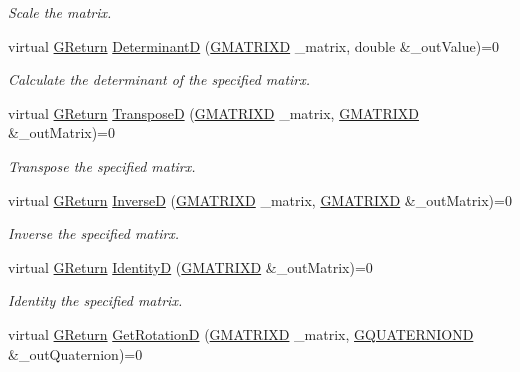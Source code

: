 \begin{DoxyCompactItemize}
\begin{DoxyCompactList}\small\item\em Scale the matrix. \end{DoxyCompactList}\item 
virtual \mbox{\hyperlink{namespaceGW_a67a839e3df7ea8a5c5686613a7a3de21}{G\+Return}} \mbox{\hyperlink{classGW_1_1MATH_1_1GMatrix_ab1b528820ac0476f8f3d9202a3036b8c}{DeterminantD}} (\mbox{\hyperlink{structGW_1_1MATH_1_1GMATRIXD}{G\+M\+A\+T\+R\+I\+XD}} \+\_\+matrix, double \&\+\_\+out\+Value)=0
\begin{DoxyCompactList}\small\item\em Calculate the determinant of the specified matirx. \end{DoxyCompactList}\item 
virtual \mbox{\hyperlink{namespaceGW_a67a839e3df7ea8a5c5686613a7a3de21}{G\+Return}} \mbox{\hyperlink{classGW_1_1MATH_1_1GMatrix_add9f6f4f4689e683143990b434248404}{TransposeD}} (\mbox{\hyperlink{structGW_1_1MATH_1_1GMATRIXD}{G\+M\+A\+T\+R\+I\+XD}} \+\_\+matrix, \mbox{\hyperlink{structGW_1_1MATH_1_1GMATRIXD}{G\+M\+A\+T\+R\+I\+XD}} \&\+\_\+out\+Matrix)=0
\begin{DoxyCompactList}\small\item\em Transpose the specified matirx. \end{DoxyCompactList}\item 
virtual \mbox{\hyperlink{namespaceGW_a67a839e3df7ea8a5c5686613a7a3de21}{G\+Return}} \mbox{\hyperlink{classGW_1_1MATH_1_1GMatrix_ade39ff1c70cb06889196893aad819244}{InverseD}} (\mbox{\hyperlink{structGW_1_1MATH_1_1GMATRIXD}{G\+M\+A\+T\+R\+I\+XD}} \+\_\+matrix, \mbox{\hyperlink{structGW_1_1MATH_1_1GMATRIXD}{G\+M\+A\+T\+R\+I\+XD}} \&\+\_\+out\+Matrix)=0
\begin{DoxyCompactList}\small\item\em Inverse the specified matirx. \end{DoxyCompactList}\item 
virtual \mbox{\hyperlink{namespaceGW_a67a839e3df7ea8a5c5686613a7a3de21}{G\+Return}} \mbox{\hyperlink{classGW_1_1MATH_1_1GMatrix_a3b7136d0cbc99d1a29d159838b5e1d91}{IdentityD}} (\mbox{\hyperlink{structGW_1_1MATH_1_1GMATRIXD}{G\+M\+A\+T\+R\+I\+XD}} \&\+\_\+out\+Matrix)=0
\begin{DoxyCompactList}\small\item\em Identity the specified matrix. \end{DoxyCompactList}\item 
virtual \mbox{\hyperlink{namespaceGW_a67a839e3df7ea8a5c5686613a7a3de21}{G\+Return}} \mbox{\hyperlink{classGW_1_1MATH_1_1GMatrix_aa8a09092d814d7599f2ddedb6a34d1ea}{Get\+RotationD}} (\mbox{\hyperlink{structGW_1_1MATH_1_1GMATRIXD}{G\+M\+A\+T\+R\+I\+XD}} \+\_\+matrix, \mbox{\hyperlink{structGW_1_1MATH_1_1GQUATERNIOND}{G\+Q\+U\+A\+T\+E\+R\+N\+I\+O\+ND}} \&\+\_\+out\+Quaternion)=0

\end{DoxyCompactItemize}
